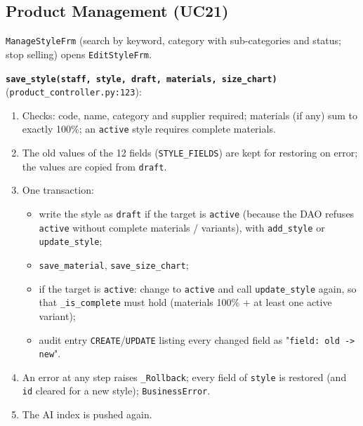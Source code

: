 \hypertarget{flow-product}{%
\subsection{Product Management (UC21)}\label{flow-product}}

\texttt{ManageStyleFrm} (search by keyword, category with sub-categories
and status; stop selling) opens \texttt{EditStyleFrm}.

\textbf{\texttt{save\_\allowbreak{}style(\allowbreak{}staff,\allowbreak{} style,\allowbreak{} draft,\allowbreak{} materials,\allowbreak{} size\_\allowbreak{}chart)}}
(\texttt{product\_\allowbreak{}controller.\allowbreak{}py:123}):

\begin{enumerate}
\def\labelenumi{\arabic{enumi}.}
\tightlist
\item
  Checks: code, name, category and supplier required; materials (if any)
  sum to exactly 100\%; an \texttt{active} style requires complete
  materials.
\item
  The old values of the 12 fields (\texttt{STYLE\_\allowbreak{}FIELDS}) are kept for
  restoring on error; the values are copied from \texttt{draft}.
\item
  One transaction:

  \begin{itemize}
  \tightlist
  \item
    write the style as \texttt{draft} if the target is \texttt{active}
    (because the DAO refuses \texttt{active} without complete materials
    / variants), with \texttt{add\_\allowbreak{}style} or \texttt{update\_\allowbreak{}style};
  \item
    \texttt{save\_\allowbreak{}material}, \texttt{save\_\allowbreak{}size\_\allowbreak{}chart};
  \item
    if the target is \texttt{active}: change to \texttt{active} and call
    \texttt{update\_\allowbreak{}style} again, so that \texttt{\_\allowbreak{}is\_\allowbreak{}complete} must
    hold (materials 100\% + at least one active variant);
  \item
    audit entry \texttt{CREATE}/\texttt{UPDATE} listing every changed
    field as "\texttt{field: old -\textgreater{}\allowbreak{} new}".
  \end{itemize}
\item
  An error at any step raises \texttt{\_\allowbreak{}Rollback}; every field of
  \texttt{style} is restored (and \texttt{id} cleared for a new style);
  \texttt{BusinessError}.
\item
  The AI index is pushed again.
\end{enumerate}

